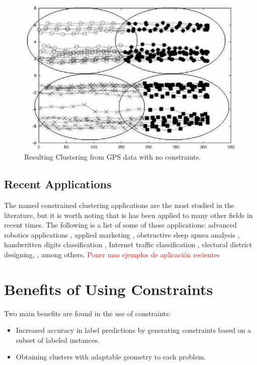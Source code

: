 \begin{figure}[!h]
	\centering
	\includegraphics[scale=0.32]{gfx/ConstClust/GPS/Instancias} 
	\caption[Resulting Clustering from GPS data with no constraints.]{Resulting Clustering from GPS data with no constraints. \cite{davidson2007survey} \cite{wagstaff2001constrained}}\label{fig:figure15}
\end{figure}

\subsection{Recent Applications}

The named constrained clustering applications are the most studied in the literature, but it is worth noting that is has been applied to many other fields in recent times. The following is a list of some of those applications: advanced robotics applications \cite{davidson2005clustering, semnani2016constrained}, applied marketing \cite{seret2014new}, obstructive sleep apnea analysis \cite{mai2018evolutionary}, handwritten digits classification \cite{li2015scalable}, Internet traffic classification \cite{wang2014internet}, electoral district designing, \cite{brieden2017constrained}, among others. \textcolor{red}{Poner mas ejemplos de aplicación recientes}

\section{Benefits of Using Constraints}

Two main benefits are found in the use of constraints:

\begin{itemize}
	
	\item Increased accuracy in label predictions by generating constraints based on a subset of labeled instances.
	
	\item Obtaining clusters with adaptable geometry to each problem.
	
\end{itemize}

